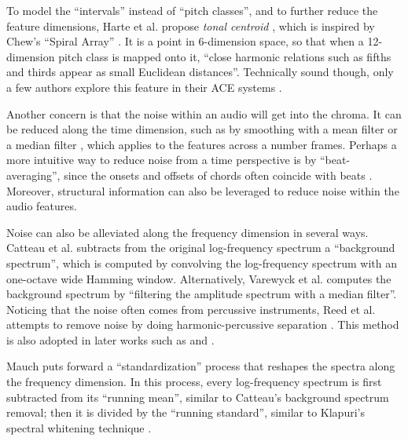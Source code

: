 To model the ``intervals'' instead of ``pitch classes'', and to further reduce the feature dimensions, Harte et al. propose {\it tonal centroid} \cite{harte2006detecting}, which is inspired by Chew's ``Spiral Array'' \cite{chew2000towards}. It is a point in 6-dimension space, so that when a 12-dimension pitch class is mapped onto it, ``close harmonic relations such as fifths and thirds appear as small Euclidean distances''. Technically sound though, only a few authors explore this feature in their ACE systems \cite{lee2008acoustic,humphrey2012learning}.
 
Another concern is that the noise within an audio will get into the chroma. It can be reduced along the time dimension, such as by smoothing with a mean filter \cite{harte2005automatic,humphrey2012rethinking} or a median filter \cite{khadkevich2009use,mauch2008discrete}, which applies to the features across a number frames. Perhaps a more intuitive way to reduce noise from a time perspective is by ``beat-averaging''\cite{bello2005robust,mauch2010approximate}, since the onsets and offsets of chords often coincide with beats \cite{goto1999real}. Moreover, structural information can also be leveraged \cite{mauch2009using,cho2011feature,cho2014improved} to reduce noise within the audio features.

Noise can also be alleviated along the frequency dimension in several ways. Catteau et al. \cite{catteau2007probabilistic} subtracts from the original log-frequency spectrum a ``background spectrum'', which is computed by convolving the log-frequency spectrum with an one-octave wide Hamming window. Alternatively, Varewyck et al. \cite{varewyck2008novel} computes the background spectrum by ``filtering the amplitude spectrum with a median filter''. Noticing that the noise often comes from percussive instruments, Reed et al. \cite{reed2009minimum} attempts to remove noise by doing harmonic-percussive separation \cite{ono2008separation}. This method is also adopted in later works such as \cite{ni2012end} and \cite{ueda2010hmm}.

Mauch \cite{mauch2010automatic} puts forward a ``standardization'' process that reshapes the spectra along the frequency dimension. In this process, every log-frequency spectrum is first subtracted from its ``running mean'', similar to Catteau's background spectrum removal; then it is divided by the ``running standard'', similar to Klapuri's spectral whitening technique \cite{klapuri2006multiple}.

